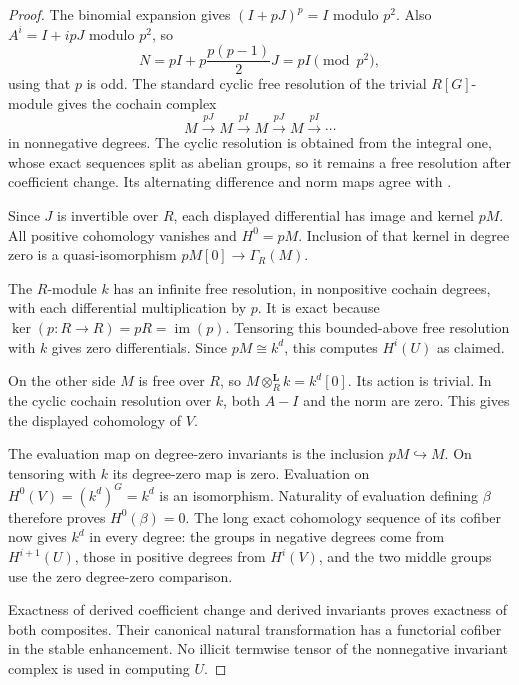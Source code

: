 \begin{proof}
The binomial expansion gives $(I+pJ)^p=I$ modulo $p^2$. Also $A^i=I+ipJ$ modulo $p^2$, so
\[
 N=pI+p\frac{p(p-1)}2J=pI\pmod{p^2},
\]
using that $p$ is odd. The standard cyclic free resolution of the trivial $R[G]$-module gives the cochain complex
\[
 M\xrightarrow{pJ}M\xrightarrow{pI}M
 \xrightarrow{pJ}M\xrightarrow{pI}\cdots
\]
in nonnegative degrees. The cyclic resolution is obtained from the integral one, whose exact sequences split as abelian groups, so it remains a free resolution after coefficient change. Its alternating difference and norm maps agree with \cite[Chapter II, 1.20 and 3.4]{MilneCFT2020}.

Since $J$ is invertible over $R$, each displayed differential has image and kernel $pM$. All positive cohomology vanishes and $H^0=pM$. Inclusion of that kernel in degree zero is a quasi-isomorphism $pM[0]\to\Gamma_R(M)$.

The $R$-module $k$ has an infinite free resolution, in nonpositive cochain degrees, with each differential multiplication by $p$. It is exact because $\ker(p:R\to R)=pR=\operatorname{im}(p)$. Tensoring this bounded-above free resolution with $k$ gives zero differentials. Since $pM\cong k^d$, this computes $H^i(U)$ as claimed.

On the other side $M$ is free over $R$, so $M\otimes_R^{\mathbf L}k=k^d[0]$. Its action is trivial. In the cyclic cochain resolution over $k$, both $A-I$ and the norm are zero. This gives the displayed cohomology of $V$.

The evaluation map on degree-zero invariants is the inclusion $pM\hookrightarrow M$. On tensoring with $k$ its degree-zero map is zero. Evaluation on $H^0(V)=(k^d)^G=k^d$ is an isomorphism. Naturality of evaluation defining $\beta$ therefore proves $H^0(\beta)=0$. The long exact cohomology sequence of its cofiber now gives $k^d$ in every degree: the groups in negative degrees come from $H^{i+1}(U)$, those in positive degrees from $H^i(V)$, and the two middle groups use the zero degree-zero comparison.

Exactness of derived coefficient change and derived invariants proves exactness of both composites. Their canonical natural transformation has a functorial cofiber in the stable enhancement. No illicit termwise tensor of the nonnegative invariant complex is used in computing $U$.
\end{proof}

